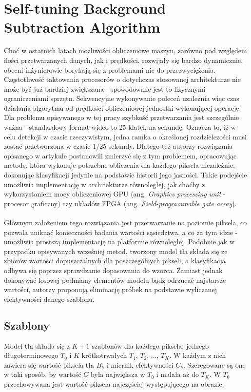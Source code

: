 \section{Self-tuning Background Subtraction Algorithm}
\label{sec:BinWang}
Choć w ostatnich latach możliwości obliczeniowe maszyn, zarówno pod względem ilości przetwarzanych danych, jak i prędkości, rozwijały się bardzo dynamicznie, obecni inżynierowie borykają się z problemami nie do przezwyciężenia. Częstotliwość taktowania procesorów o dotychczas stosowanej architekturze nie może być już bardziej zwiększana - spowodowane jest to fizycznymi ograniczeniami sprzętu. Sekwencyjne wykonywanie poleceń uzależnia więc czas działania algorytmu od prędkości obliczeniowej jednostki wykonującej operacje. Dla problemu opisywanego w tej pracy szybkość przetwarzania jest szczególnie ważna - standardowy format wideo to 25 klatek na sekundę. Oznacza to, iż w celu detekcji w czasie rzeczywistym, jedna ramka o określonej rozdzielczości musi zostać przetworzona w czasie 1/25 sekundy. Dlatego też autorzy rozwiązania opisanego w artykule \cite{6910012} postanowili zmierzyć się z tym problemem, opracowując metodę, która wykonuje potrzebne obliczenia dla każdego piksela niezależnie, dokonując klasyfikacji jedynie na podstawie historii jego jasności. Takie podejście umożliwia implementację w architekturze równoległej, jak choćby z wykorzystaniem mocy obliczeniowej GPU (ang. \textit{Graphics processing unit} - procesor graficzny) czy układów FPGA (ang. \textit{Field-programmable gate array}).
\paragraph{}
Głównym założeniem tego rozwiązania jest przetwarzanie na poziomie piksela, co pozwala uniknąć konieczności badania wartości sąsiedztwa, a co za tym idzie - umożliwia prostszą implementację na platformie równoległej. Podobnie jak w przypadku opisywanych wcześniej metod, tworzony model tła składa się ze zbiorów wartości dopuszczalnych dla poszczególnych pikseli, a klasyfikacja odbywa się poprzez sprawdzanie dopasowania do wzorca. Zamiast jednak dokonywać losowej podmiany elementów modelu bądź odrzucać najstarsze wartości, autorzy proponują eliminację próbek na podstawie wyliczanej efektywności danego szablonu.
\subsection{Szablony}
Model tła składa się z $K+1$ szablonów dla każdego piksela: jednego długoterminowego $T_{0}$ i $K$ krótkotrwałych $T_{1}$, $T_{2}$, ..., $T_{K}$. W każdym z nich zawiera się wartość piksela tła $B_{k}$ i miernik efektywności $C_{k}$. Szeregowane są one w taki sposób, by wartość $C$ była największa w $T_{0}$ i malała aż do $T_{K}$. W $T_{0}$ przechowywana jest wartość piksela najczęściej występującego na obrazie.
